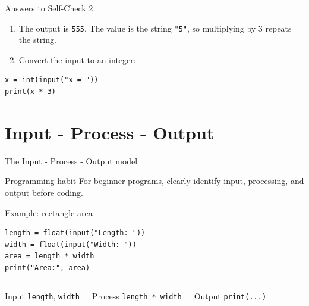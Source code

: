 \documentclass[aspectratio=169,10pt]{beamer}
\begin{document}
\begin{frame}[fragile]{Answers to Self-Check 2}
\begin{enumerate}
  \item The output is \texttt{555}. The value is the string \texttt{"5"}, so multiplying by 3 repeats the string.
  \item Convert the input to an integer:
\end{enumerate}
\begin{lstlisting}
x = int(input("x = "))
print(x * 3)
\end{lstlisting}
\end{frame}

\section{Input - Process - Output}

\begin{frame}{The Input - Process - Output model}
\begin{center}
\end{center}
\begin{block}{Programming habit}
For beginner programs, clearly identify input, processing, and output before coding.
\end{block}
\end{frame}

\begin{frame}[fragile]{Example: rectangle area}
\begin{lstlisting}
length = float(input("Length: "))
width = float(input("Width: "))
area = length * width
print("Area:", area)
\end{lstlisting}
\begin{columns}[T,onlytextwidth]
\begin{block}{Input}
\texttt{length}, \texttt{width}
\end{block}
\begin{block}{Process}
\texttt{length * width}
\end{block}
\begin{block}{Output}
\texttt{print(...)}
\end{block}
\end{columns}
\end{frame}
\end{document}
